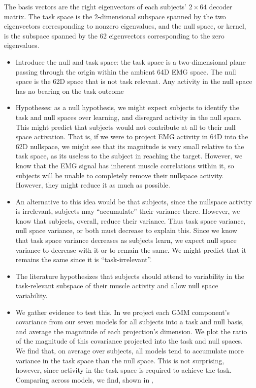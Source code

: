 \documentclass[../main.tex]{subfiles}
\begin{document}
The basis vectors are the right eigenvectors of each subjects' $2\times64$ decoder matrix. The task space is the 2-dimensional subspace spanned by the two eigenvectors corresponding to nonzero eigenvalues, and the null space, or kernel, is the subspace spanned by the 62 eigenvectors corresponding to the zero eigenvalues.


\begin{itemize}
  \setlength\itemsep{0em}
  \item Introduce the null and task space: the task space is a two-dimensional plane passing through the origin within the ambient 64D EMG space. The null space is the 62D space that is not task relevant. Any activity in the null space has no bearing on the task outcome
  \item Hypotheses: as a null hypothesis, we might expect subjects to identify the task and null spaces over learning, and disregard activity in the null space. This might predict that subjects would not contribute at all to their null space activation. That is, if we were to project EMG activity in 64D into the 62D nullspace, we might see that its magnitude is very small relative to the task space, as its useless to the subject in reaching the target. However, we know that the EMG signal has inherent muscle correlations within it, so subjects will be unable to completely remove their nullspace activity. However, they might reduce it as much as possible.
  \item An alternative to this idea would be that subjects, since the nullspace activity is irrelevant, subjects may ``accumulate'' their variance there. However, we know that subjects, overall, reduce their variance. Thus task space variance, null space variance, or both must decrease to explain this. Since we know that task space variance decreases as subjects learn, we expect null space variance to decrease with it or to remain the same. We might predict that it remains the same since it is ``task-irrelevant''. 
  \item The literature \rbrack{} hypothesizes that subjects should attend to variability in the task-relevant subspace of their muscle activity and allow null space variability\cite{Valero-Cuevas2009}.
  \item We gather evidence to test this. In  we project each GMM component's covariance from our seven models for all subjects into a task and null basis, and average the magnitude of each projection's dimension. We plot the ratio of the magnitude of this covariance projected into the task and null spaces. We find that, on average over subjects, all models tend to accumulate more variance in the task space than the null space. This is not surprising, however, since activity in the task space is required to achieve the task. Comparing across models, we find, shown in , 

\end{itemize}
\end{document}

